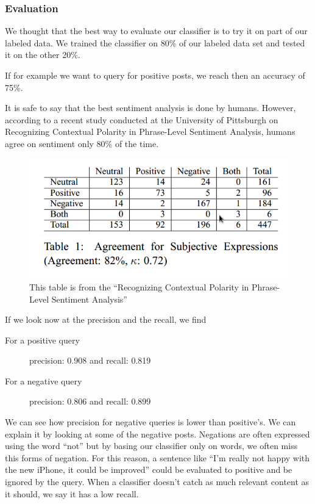 \subsubsection*{Evaluation}
We thought that the best way to evaluate our classifier is to try it on part of our labeled data.
We trained the classifier on 80\% of our labeled data set and tested it on the other 20\%.

If for example we want to query for positive posts, we reach then an accuracy of 75\%.

It is safe to say that the best sentiment analysis is done by humans\cite{sentiment_analysis}. However, according to a recent
study conducted at the University of Pittsburgh on Recognizing Contextual Polarity in Phrase-Level Sentiment Analysis\cite{polarity},
humans agree on sentiment only 80\% of the time.


\begin{figure}[h]
\centering
\includegraphics[scale=.5]{images/sent1.png}
\caption{This table is from the ``Recognizing Contextual Polarity in Phrase-Level Sentiment Analysis''}
\end{figure}

If we look now at the precision and the recall, we find

\begin{description}
 \item[For a positive query]

  precision: 0.908 and
  recall: 0.819


 \item[For a negative query]

  precision: 0.806 and
  recall: 0.899

\end{description}

We can see how precision for negative queries is lower than positive’s. We can explain it by looking at some of the negative posts.
Negations are often expressed using the word “not” but by basing our classifier only on words, we often miss this forms of negation.
For this reason, a sentence like “I’m really not happy with the new iPhone, it could be improved” could be evaluated to positive and be
ignored by the query. When a classifier doesn’t catch as much relevant content as it should, we say it has a low recall.

